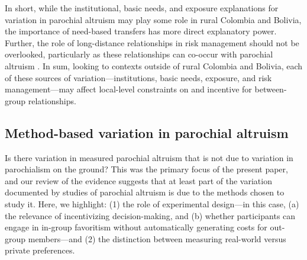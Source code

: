 \documentclass[bibauthoryear]{aa}
\begin{document}
In short, while the institutional, basic needs, and exposure explanations for variation in parochial altruism may play some role in rural Colombia and Bolivia, the importance of need-based transfers  has more direct explanatory power. Further, the role of long-distance relationships in risk management should not be overlooked, particularly as these relationships can co-occur with parochial altruism  \citep{bollig1993intra, brewer1976ethnocentrism, lathrap1973antiquity, bowles2004persistent}. %
In sum, looking to contexts outside of rural Colombia and Bolivia, each of these sources of variation---institutions, basic needs, exposure, and risk management---may affect local-level constraints on and incentive for between-group relationships.

\subsection{Method-based variation in parochial altruism}

Is there variation in measured parochial altruism that is not due to variation in parochialism on the ground? This was the primary focus of the present paper, and our review of the evidence suggests that at least part of the variation documented by studies of parochial altruism is due to the methods chosen to study it. Here, we highlight: (1) the role of experimental design---in this case, (a) the relevance of incentivizing decision-making, and (b) whether participants can engage in in-group favoritism without automatically generating costs for out-group members---and (2) the distinction between measuring real-world versus private preferences.
\end{document}
